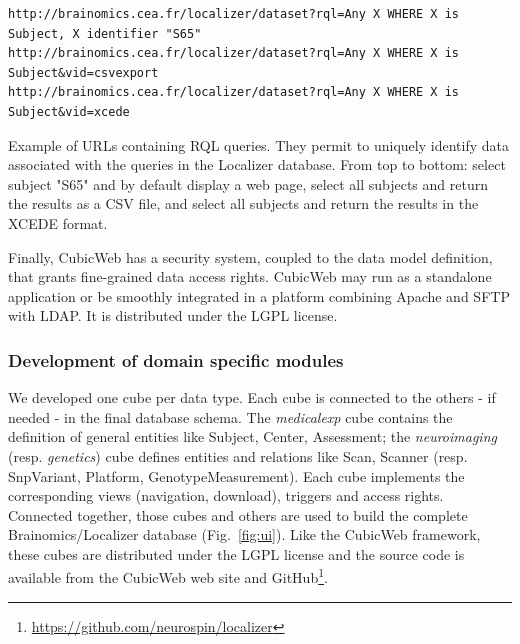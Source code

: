 \documentclass[preprint,review,12pt]{elsarticle}
\begin{document}
\begin{listing}[H]
\begin{verbatim}
http://brainomics.cea.fr/localizer/dataset?rql=Any X WHERE X is Subject, X identifier "S65"
http://brainomics.cea.fr/localizer/dataset?rql=Any X WHERE X is Subject&vid=csvexport
http://brainomics.cea.fr/localizer/dataset?rql=Any X WHERE X is Subject&vid=xcede
\end{verbatim}
\caption{Example of URLs containing RQL queries. They permit to uniquely identify data associated with the queries in the Localizer database. From top to bottom: select subject "S65" and by default display a web page, select all subjects and return the results as a CSV file, and select all subjects and return the results in the XCEDE format.}
\label{code:rql}
\end{listing}


Finally, CubicWeb has a security system, coupled to the data model definition, that grants fine-grained data access rights. CubicWeb may run as a standalone application or be smoothly integrated in a platform combining Apache and SFTP with LDAP. It is distributed under the LGPL license.


\subsubsection{Development of domain specific modules}

We developed one cube per data type. Each cube is connected to the others - if needed - in the final database schema. The \textit{medicalexp} cube contains the definition of general entities like Subject, Center, Assessment; the \textit{neuroimaging} (resp. \textit{genetics}) cube defines entities and relations like Scan, Scanner (resp. SnpVariant, Platform, GenotypeMeasurement). Each cube implements the corresponding views (navigation, download), triggers and access rights. Connected together, those cubes and others are used to build the complete Brainomics/Localizer database (Fig.~\ref{fig:ui}). Like the CubicWeb framework, these cubes are distributed under the LGPL license and the source code is available from the CubicWeb web site and GitHub\footnote{\url{https://github.com/neurospin/localizer}}.
\end{document}
